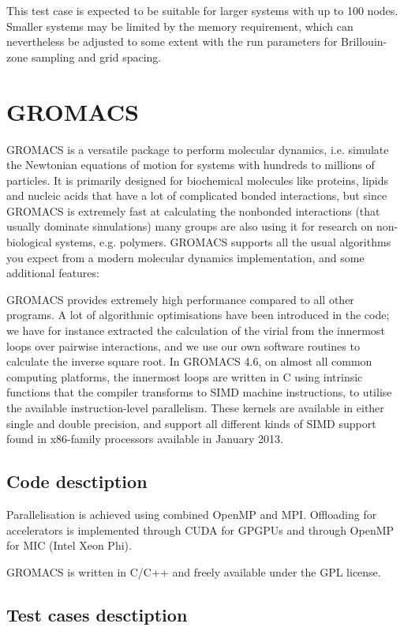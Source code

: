 This test case is expected to be suitable for larger systems with up to 100 nodes. Smaller systems may be limited by the memory requirement, which can nevertheless be adjusted to some extent with the run parameters for Brillouin-zone sampling and grid spacing.


\section{GROMACS}
GROMACS is a versatile package to perform molecular dynamics, i.e. simulate the Newtonian equations of motion for systems with hundreds to millions of particles.
It is primarily designed for biochemical molecules like proteins, lipids and nucleic acids that have a lot of complicated bonded interactions, but since GROMACS is extremely fast at calculating the nonbonded interactions (that usually dominate simulations) many groups are also using it for research on non-biological systems, e.g. polymers.
GROMACS supports all the usual algorithms you expect from a modern molecular dynamics implementation, and some additional features:

GROMACS provides extremely high performance compared to all other programs. A lot of algorithmic optimisations have been introduced in the code; we have for instance extracted the calculation of the virial from the innermost loops over pairwise interactions, and we use our own software routines to calculate the inverse square root. In GROMACS 4.6, on almost all common computing platforms, the innermost loops are written in C using intrinsic functions that the compiler transforms to SIMD machine instructions, to utilise the available instruction-level parallelism. These kernels are available in either single and double precision, and support all different kinds of SIMD support found in x86-family processors available in January 2013.

\subsection{Code desctiption}
Parallelisation is achieved using combined OpenMP and MPI.
Offloading for accelerators is implemented through CUDA for GPGPUs and through OpenMP for MIC (Intel Xeon Phi).

GROMACS is written in C/C++ and freely available under the GPL license.

\subsection{Test cases desctiption}

